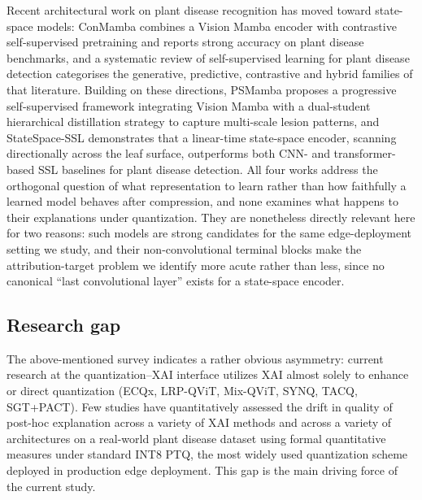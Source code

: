 \documentclass[fleqn,10pt]{wlscirep}
\begin{document}
Recent architectural work on plant disease recognition has moved toward state-space models: ConMamba combines a Vision Mamba encoder with contrastive self-supervised pretraining and reports strong accuracy on plant disease benchmarks\cite{AlMamun2026conmamba}, and a systematic review of self-supervised learning for plant disease detection categorises the generative, predictive, contrastive and hybrid families of that literature\cite{AlMamun2024access}. Building on these directions, PSMamba\cite{AlMamun2025psmamba} proposes a progressive self-supervised framework integrating Vision Mamba with a dual-student hierarchical distillation strategy to capture multi-scale lesion patterns, and StateSpace-SSL\cite{AlMamun2026statespacssl} demonstrates that a linear-time state-space encoder, scanning directionally across the leaf surface, outperforms both CNN- and transformer-based SSL baselines for plant disease detection. All four works address the orthogonal question of what representation to learn rather than how faithfully a learned model behaves after compression, and none examines what happens to their explanations under quantization. They are nonetheless directly relevant here for two reasons: such models are strong candidates for the same edge-deployment setting we study, and their non-convolutional terminal blocks make the attribution-target problem we identify more acute rather than less, since no canonical ``last convolutional layer'' exists for a state-space encoder.

\subsection*{Research gap}

The above-mentioned survey indicates a rather obvious asymmetry: current research at the quantization--XAI interface utilizes XAI almost solely to enhance or direct quantization (ECQx\cite{Becking2022ecqx}, LRP-QViT\cite{Ranjan2024lrpqvit}, Mix-QViT\cite{Ranjan2025mixqvit}, SYNQ\cite{Kim2025synq}, TACQ\cite{Xiao2025tacq}, SGT+PACT\cite{Maleki2024quantized,Rezabeyk2024saliency}). Few studies have quantitatively assessed the drift in quality of post-hoc explanation across a variety of XAI methods and across a variety of architectures on a real-world plant disease dataset using formal quantitative measures under standard INT8 PTQ, the most widely used quantization scheme deployed in production edge deployment. This gap is the main driving force of the current study.

\vspace{-6pt}
\end{document}
